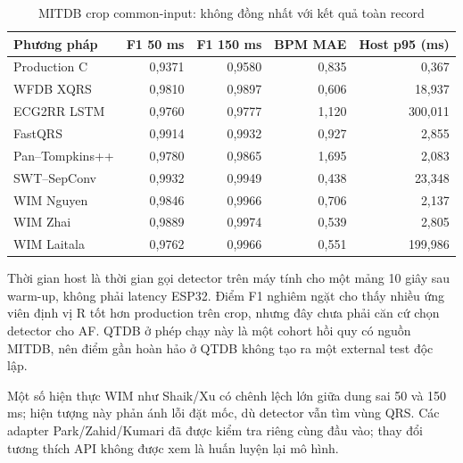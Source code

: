 \documentclass[12pt,a4paper,oneside]{report}
\begin{document}
\begin{table}[H]
\centering\small
\caption{MITDB crop common-input: không đồng nhất với kết quả toàn record}\label{tab:qrscommon}
\begin{tabular}{lrrrr}
\toprule Phương pháp & F1 50 ms & F1 150 ms & BPM MAE & Host p95 (ms)\\\midrule
Production C & 0,9371 & 0,9580 & 0,835 & 0,367\\
WFDB XQRS & 0,9810 & 0,9897 & 0,606 & 18,937\\
ECG2RR LSTM & 0,9760 & 0,9777 & 1,120 & 300,011\\
FastQRS & 0,9914 & 0,9932 & 0,927 & 2,855\\
Pan--Tompkins++ & 0,9780 & 0,9865 & 1,695 & 2,083\\
SWT--SepConv & 0,9932 & 0,9949 & 0,438 & 23,348\\
WIM Nguyen & 0,9846 & 0,9966 & 0,706 & 2,137\\
WIM Zhai & 0,9889 & 0,9974 & 0,539 & 2,805\\
WIM Laitala & 0,9762 & 0,9966 & 0,551 & 199,986\\
\bottomrule
\end{tabular}
\end{table}

Thời gian host là thời gian gọi detector trên máy tính cho một mảng 10 giây sau warm-up, không phải latency ESP32. Điểm F1 nghiêm ngặt cho thấy nhiều ứng viên định vị R tốt hơn production trên crop, nhưng đây chưa phải căn cứ chọn detector cho AF. QTDB ở phép chạy này là một cohort hồi quy có nguồn MITDB, nên điểm gần hoàn hảo ở QTDB không tạo ra một external test độc lập.

Một số hiện thực WIM như Shaik/Xu có chênh lệch lớn giữa dung sai 50 và 150 ms; hiện tượng này phản ánh lỗi đặt mốc, dù detector vẫn tìm vùng QRS. Các adapter Park/Zahid/Kumari đã được kiểm tra riêng cùng đầu vào; thay đổi tương thích API không được xem là huấn luyện lại mô hình.
\end{document}
